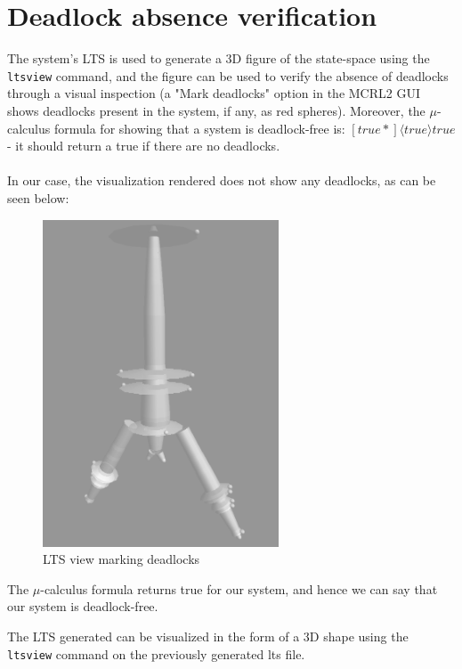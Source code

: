 \section{Deadlock absence verification}
The system's LTS is used to generate a 3D figure of the state-space using the \texttt{ltsview} command, and the figure can be used to verify the absence of deadlocks through a visual inspection (a "Mark deadlocks" option in the MCRL2 GUI shows deadlocks present in the system, if any, as red spheres).
Moreover, the $\mu$-calculus formula for showing that a system is deadlock-free is: $[true*] \langle true \rangle true$ - it should return a true if there are no deadlocks.
\\\\
In our case, the visualization rendered does not show any deadlocks, as can be seen below:
\begin{figure}[h]
\centering
\includegraphics[width=70mm]{img/ltsview-nodeadlocks.PNG}
\caption{LTS view marking deadlocks\label{fig:ltsviewnodeadlocks}}
\end{figure}

The $\mu$-calculus formula returns true for our system, and hence we can say that our system is deadlock-free.

The LTS generated can be visualized in the form of a 3D shape using the \texttt{ltsview} command on the previously generated lts file.